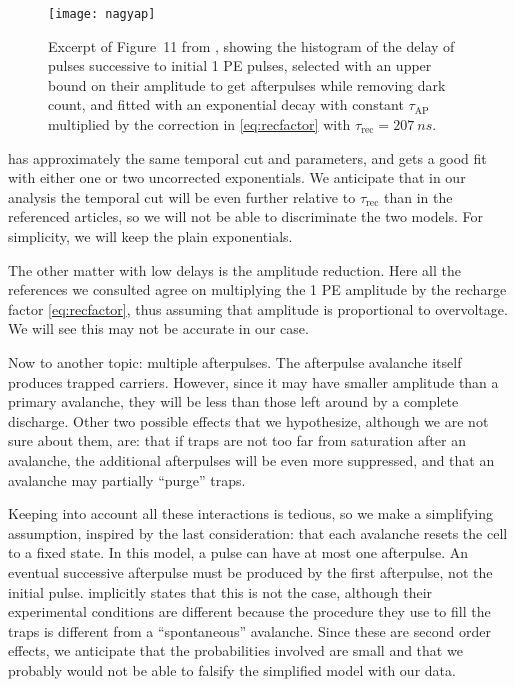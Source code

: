 \begin{figure}
    
    \centering
    \texttt{[image: nagyap]}
    
    \caption{\label{fig:nagyap} Excerpt of Figure~11 from \cite{nagy2014},
    showing the histogram of the delay of pulses successive to initial 1 PE
    pulses, selected with an upper bound on their amplitude to get afterpulses
    while removing dark count, and fitted with an exponential decay with
    constant $\tau_\text{AP}$ multiplied by the correction in
    \autoref{eq:recfactor} with $\tau_\text{rec} = \SI{207}{ns}$.}
    
\end{figure}

\cite{garutti2014} has approximately the same temporal cut and parameters, and
gets a good fit with either one or two uncorrected exponentials. We anticipate
that in our analysis the temporal cut will be even further relative to
$\tau_\text{rec}$ than in the referenced articles, so we will not be able to
discriminate the two models. For simplicity, we will keep the plain
exponentials.

The other matter with low delays is the amplitude reduction. Here all the
references we consulted agree on multiplying the 1 PE amplitude by the recharge
factor \eqref{eq:recfactor}, thus assuming that amplitude is proportional to
overvoltage. We will see this may not be accurate in our case.

Now to another topic: multiple afterpulses. The afterpulse avalanche itself
produces trapped carriers. However, since it may have smaller amplitude than a
primary avalanche, they will be less than those left around by a complete
discharge. Other two possible effects that we hypothesize, although we are not
sure about them, are: that if traps are not too far from saturation after an
avalanche, the additional afterpulses will be even more suppressed, and that an
avalanche may partially ``purge'' traps.

Keeping into account all these interactions is tedious, so we make a
simplifying assumption, inspired by the last consideration: that each avalanche
resets the cell to a fixed state. In this model, a pulse can have at most one
afterpulse. An eventual successive afterpulse must be produced by the first
afterpulse, not the initial pulse. \cite{cova1991} implicitly states that this
is not the case, although their experimental conditions are different because
the procedure they use to fill the traps is different from a ``spontaneous''
avalanche. Since these are second order effects, we anticipate that the
probabilities involved are small and that we probably would not be able to
falsify the simplified model with our data.

